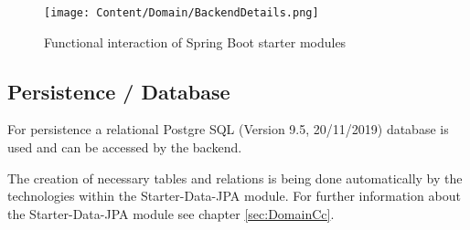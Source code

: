 \begin{figure}[H]
	\centering
	\texttt{[image: Content/Domain/BackendDetails.png]}
	\caption{Functional interaction of Spring Boot starter modules}
	\cite{own representation}
	\label{fig:backenddetails}
\end{figure}

\subsection{Persistence / Database}
\label{sec:DomainCd}

For persistence a relational Postgre \acs{SQL} (Version 9.5, 20/11/2019) database is used and can be accessed by the backend. 

The creation of necessary tables and relations is being done automatically by the technologies within the Starter-Data-\ac{JPA} module. For further information about the Starter-Data-\ac{JPA} module see chapter \ref{sec:DomainCc}.

